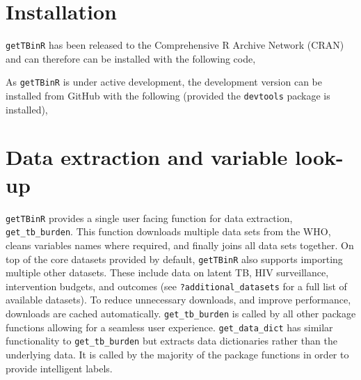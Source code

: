 \documentclass[11pt,twoside]{bristolthesis}
\begin{document}
  \hypertarget{installation}{%
  \section{Installation}\label{installation}}
  
  \texttt{getTBinR} has been released to the Comprehensive R Archive Network (CRAN) and can therefore can be installed with the following code,
  \begin{Shaded}
  \begin{Highlighting}[]
  \NormalTok{(}\NormalTok{)}
  \end{Highlighting}
  \end{Shaded}
  As \texttt{getTBinR} is under active development, the development version can be installed from GitHub with the following (provided the \texttt{devtools} package is installed),
  \begin{Shaded}
  \begin{Highlighting}[]
  \OperatorTok{::}\NormalTok{(}\NormalTok{)}
  \end{Highlighting}
  \end{Shaded}
  \hypertarget{data-extraction-and-variable-look-up}{%
  \section{Data extraction and variable look-up}\label{data-extraction-and-variable-look-up}}
  
  \texttt{getTBinR} provides a single user facing function for data extraction, \texttt{get\_tb\_burden}. This function downloads multiple data sets from the WHO, cleans variables names where required, and finally joins all data sets together. On top of the core datasets provided by default, \texttt{getTBinR} also supports importing multiple other datasets. These include data on latent TB, HIV surveillance, intervention budgets, and outcomes (see \texttt{?additional\_datasets} for a full list of available datasets). To reduce unnecessary downloads, and improve performance, downloads are cached automatically. \texttt{get\_tb\_burden} is called by all other package functions allowing for a seamless user experience. \texttt{get\_data\_dict} has similar functionality to \texttt{get\_tb\_burden} but extracts data dictionaries rather than the underlying data. It is called by the majority of the package functions in order to provide intelligent labels.
  
\end{document}
